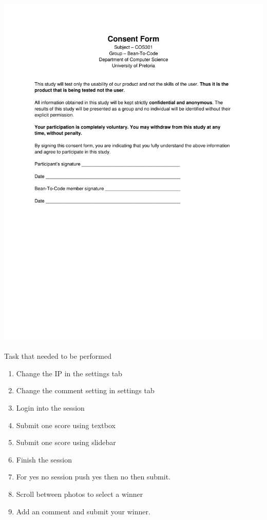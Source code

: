 \documentclass[10pt,a4paper]{article}
\begin{document}
\paragraph{} 
\advance\leftskip-1.3cm
\includegraphics[scale=0.55]{Pictures/ConsentForm.pdf}
\pagebreak
\paragraph{} Task that needed to be performed
\begin{enumerate}
\item Change the IP in the settings tab
\item Change the comment setting in settings tab
\item Login into the session
\item Submit one score using textbox
\item Submit one score using slidebar
\item Finish the session
\item For yes no session push yes then no then submit.
\item Scroll between photos to select a winner
\item Add an comment and submit your winner.
\end{enumerate}
\end{document}

